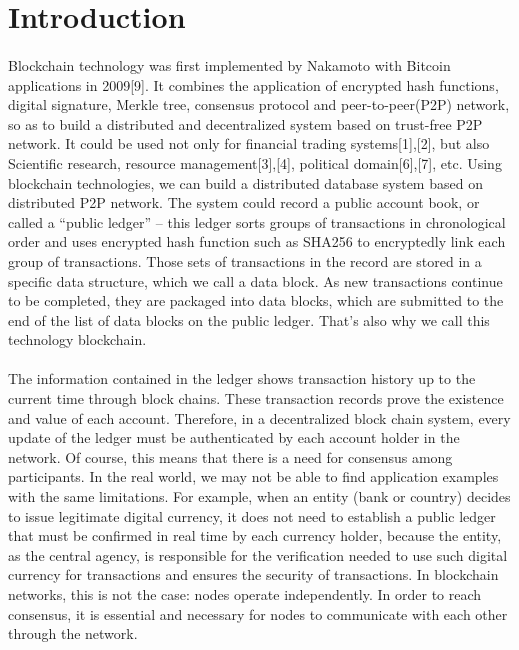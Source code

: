 \documentclass[doublespacing]{bmcart}
\begin{document}
\begin{CJK*}{UTF8}{gbsn}
\paragraph{}


\section{Introduction}
\paragraph{}
Blockchain technology was first implemented by Nakamoto with Bitcoin applications in 2009[9]. It combines the application of encrypted hash functions, digital signature, Merkle tree, consensus protocol and peer-to-peer(P2P) network, so as to build a distributed and decentralized system based on trust-free P2P network. It could be used not only for financial trading systems[1],[2], but also Scientific  research,  resource management[3],[4], political domain[6],[7], etc. Using blockchain technologies, we can build a distributed database system based on distributed P2P network. The system could record a public account book, or called a ``public ledger'' – this ledger sorts groups of transactions in chronological order and uses encrypted hash function such as SHA256 to encryptedly link each group of transactions. Those sets of transactions in the record are stored in a specific data structure, which we call a data block. As new transactions continue to be completed, they are packaged into data blocks, which are submitted to the end of the list of data blocks on the public ledger. That's also why we call this technology blockchain.
	\paragraph{}
	The information contained in the ledger shows transaction history up to the current time through block chains. These transaction records prove the existence and value of each account. Therefore, in a decentralized block chain system, every update of the ledger must be authenticated by each account holder in the network. Of course, this means that there is a need for consensus among participants. In the real world, we may not be able to find application examples with the same limitations. For example, when an entity (bank or country) decides to issue legitimate digital currency, it does not need to establish a public ledger that must be confirmed in real time by each currency holder, because the entity, as the central agency, is responsible for the verification needed to use such digital currency for transactions and ensures the security of transactions. In blockchain networks, this is not the case: nodes operate independently. In order to reach consensus, it is essential and necessary for nodes to communicate with each other through the network.

\end{CJK*}
\end{document}
